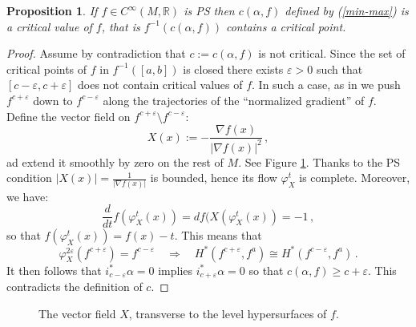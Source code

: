\documentclass{article}
\newcommand{\1}{\mathbbm{1}}
\newtheorem{prp}[thm]{Proposition}
\theoremstyle{remark}
\begin{document}
{{\begin{prp}
If $f \in C^{\infty}(M,\mathbb{R})$ is PS then $c(\alpha,f)$ defined by (\ref{min-max}) is a critical value of $f$, that is $f^{-1}(c(\alpha,f))$ contains a critical point.
\end{prp}
\begin{proof} Assume by contradiction that $c := c(\alpha,f)$ is not critical. Since the set of critical points of $f$ in $f^{-1}([a,b])$ is closed there exists $\varepsilon > 0$ such that $[c-\varepsilon,c+\varepsilon]$ does not contain critical values of $f$. In such a case, as in \cite[Theorem 3.2]{mil63} we push $f^{c + \varepsilon}$ down to $f^{c-\varepsilon}$ along the  trajectories of the ``normalized gradient'' of $f$.
Define the vector field on $f^{c+\varepsilon}\setminus f^{c-\varepsilon}$:
    \begin{equation} \label{normalized gradient}
        X(x):=-\frac{\nabla f(x)}{\vert\nabla f(x)\vert^2}\,,
    \end{equation}
ad extend it smoothly by zero on the rest of $M$. See Figure \ref{milnorField}.
Thanks to the PS condition $\vert X(x)\vert= \frac{1}{\vert \nabla f(x)\vert} $ is bounded, hence its flow $\varphi^t_X$ is complete. Moreover, we have:
    \begin{equation}
        \frac{d}{dt}f(\varphi^t_X(x))=df(X(\varphi^t_X(x))=-1\, ,
    \end{equation}
so that $f(\varphi^t_X(x)) = f(x) -t$. This means that
$$\varphi^{2\varepsilon}_X(f^{c+\varepsilon}) = f^{c -\varepsilon} \quad \Rightarrow \quad H^*(f^{c+\varepsilon}, f^{a}) \cong H^*(f^{c-\varepsilon}, f^a)\, .$$
It then follows that $i^*_{c-\varepsilon} \alpha = 0$ implies $i^*_{c+\varepsilon} \alpha = 0$ so that $c(\alpha,f) \ge c + \varepsilon$. This contradicts the definition of $c$. 
\end{proof}
\begin{figure}[ht]
    \centering
    
    \caption{The vector field $X$, transverse to the level hypersurfaces of $f$.}
    \label{milnorField}
\end{figure}

}}
\end{document}
